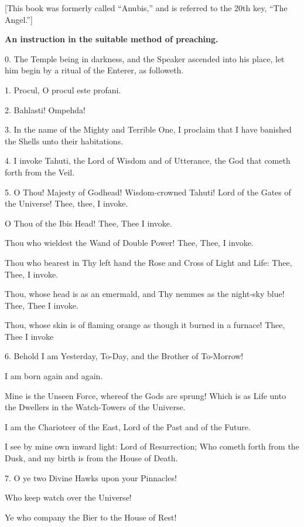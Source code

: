 
[This book was formerly called \enquote{Anubis,} and is referred to the 20th key, \enquote{The Angel.}]

\textbf{An instruction in the suitable method of preaching.}

0. The Temple being in darkness, and the Speaker ascended into his place, let him begin by a ritual of the Enterer, as followeth.

1.  Procul, O procul este profani.

2. Bahlasti! Ompehda!

3. In the name of the Mighty and Terrible One, I proclaim that I have banished the Shells unto their habitations.

4. I invoke Tahuti, the Lord of Wisdom and of Utterance, the God that cometh forth from the Veil.

5. O Thou! Majesty of Godhead! Wisdom-crowned Tahuti! Lord of the Gates of the Universe! Thee, thee, I invoke.

O Thou of the Ibis Head! Thee, Thee I invoke.

Thou who wieldest the Wand of Double Power! Thee, Thee, I invoke.

Thou who bearest in Thy left hand the Rose and Cross of Light and Life: Thee, Thee, I invoke.

Thou, whose head is as an emermald, and Thy nemmes as the night-sky blue! Thee, Thee I invoke.

Thou, whose skin is of flaming orange as though it burned in a furnace! Thee, Thee I invoke

6. Behold I am Yesterday, To-Day, and the Brother of To-Morrow!

I am born again and again.

Mine is the Unseen Force, whereof the Gods are sprung! Which is as Life unto the Dwellers in the Watch-Towers of the Universe.

I am the Charioteer of the East, Lord of the Past and of the Future.

I see by mine own inward light: Lord of Resurrection; Who cometh forth from the Dusk, and my birth is from the House of Death.

7. O ye two Divine Hawks upon your Pinnacles!

Who keep watch over the Universe!

Ye who company the Bier to the House of Rest!

